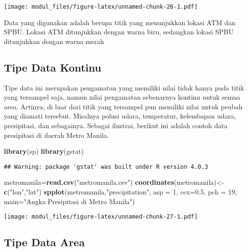 \documentclass[
]{book}
\newenvironment{Shaded}{\begin{snugshade}}{\end{snugshade}}
\newcommand{\DataTypeTok}[1]{\textcolor[rgb]{0.13,0.29,0.53}{#1}}
\newcommand{\DecValTok}[1]{\textcolor[rgb]{0.00,0.00,0.81}{#1}}
\newcommand{\FloatTok}[1]{\textcolor[rgb]{0.00,0.00,0.81}{#1}}
\newcommand{\KeywordTok}[1]{\textcolor[rgb]{0.13,0.29,0.53}{\textbf{#1}}}
\newcommand{\NormalTok}[1]{#1}
\newcommand{\StringTok}[1]{\textcolor[rgb]{0.31,0.60,0.02}{#1}}
\begin{document}
\texttt{[image: modul\_files/figure-latex/unnamed-chunk-26-1.pdf]}

Data yang digunakan adalah berupa titik yang menunjukkan lokasi ATM dan SPBU. Lokasi ATM ditunjukkan dengan warna biru, sedangkan lokasi SPBU ditunjukkan dengan warna merah

\hypertarget{tipe-data-kontinu}{%
\subsection{Tipe Data Kontinu}\label{tipe-data-kontinu}}

Tipe data ini merupakan pengamatan yang memiliki nilai tidak hanya pada titik yang tersampel saja, namun nilai pengamatan sebenarnya kontinu untuk semua area. Artinya, di luar dari titik yang tersampel pun memiliki nilai untuk peubah yang diamati tersebut. Misalnya polusi udara, temperatur, kelembapan udara, presipitasi, dan sebagainya. Sebagai ilustrai, berikut ini adalah contoh data presipitasi di daerah Metro Manila.

\begin{Shaded}
\begin{Highlighting}[]
\KeywordTok{library}\NormalTok{(sp)}
\KeywordTok{library}\NormalTok{(gstat)}
\end{Highlighting}
\end{Shaded}

\begin{verbatim}
## Warning: package 'gstat' was built under R version 4.0.3
\end{verbatim}

\begin{Shaded}
\begin{Highlighting}[]
\NormalTok{metromanila=}\KeywordTok{read.csv}\NormalTok{(}\StringTok{"metromanila.csv"}\NormalTok{)}
\KeywordTok{coordinates}\NormalTok{(metromanila)\textless{}{-}}\KeywordTok{c}\NormalTok{(}\StringTok{"lon"}\NormalTok{,}\StringTok{"lat"}\NormalTok{)}
\KeywordTok{spplot}\NormalTok{(metromanila,}\StringTok{"precipitation"}\NormalTok{, }\DataTypeTok{asp =} \DecValTok{1}\NormalTok{,}
       \DataTypeTok{cex=}\FloatTok{0.5}\NormalTok{, }\DataTypeTok{pch =} \DecValTok{19}\NormalTok{, }\DataTypeTok{main=}\StringTok{"Angka Presipitasi di Metro Manila"}\NormalTok{)}
\end{Highlighting}
\end{Shaded}

\texttt{[image: modul\_files/figure-latex/unnamed-chunk-27-1.pdf]}

\hypertarget{tipe-data-area}{%
\subsection{Tipe Data Area}\label{tipe-data-area}}
\end{document}
